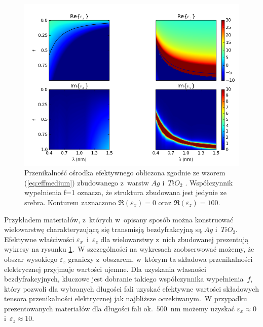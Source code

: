 \begin{figure}[htb]
	\includegraphics[width=\textwidth]{images/multilayer/agtio2-effective.png}
	\caption{Przenikalność ośrodka efektywnego obliczona zgodnie ze wzorem (\ref{eq:effmedium})  zbudowanego z~warstw $Ag$ \cite{PhysRevB.6.4370} i~$TiO_2$ \cite{DEVORE:51}. Współczynnik wypełnienia f=1 oznacza, że struktura zbudowana jest jedynie ze srebra. Konturem zaznaczono $\Re(\varepsilon_x)=0$ oraz $\Re(\varepsilon_z)=100$.}
	\label{fig:multiex}
\end{figure}

Przykładem materiałów, z~których w~opisany sposób można konstruować wielowarstwę charakteryzującą się transmisją bezdyfrakcyjną są $Ag$ i~$TiO_2$. Efektywne właściwości $\varepsilon_x$~i~$\varepsilon_z$ dla wielowarstwy z~nich zbudowanej prezentują wykresy na rysunku \ref{fig:multiex}.~W szczególności na wykresach zaobserwować możemy, że obszar wysokiego $\varepsilon_z$ graniczy z~obszarem, w~którym ta składowa przenikalności elektrycznej przyjmuje wartości ujemne. Dla uzyskania własności bezdyfrakcyjnych, kluczowe jest dobranie takiego współczynnika wypełnienia~$f$, który pozwoli dla wybranych długości fali uzyskać efektywne wartości składowych tensora przenikalności elektrycznej jak najbliższe oczekiwanym.~W przypadku prezentowanych materiałów dla długości fali ok.~$500$~nm możemy uzyskać $\varepsilon_x \approx 0$ i~$\varepsilon_z \approx 10$.







